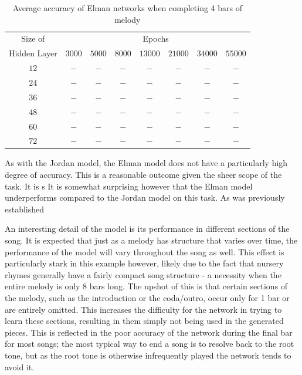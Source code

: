 \documentclass[ author={Stephen Livermore-Tozer},
				supervisor={Dr. Peter Flach},
				degree={MEng},
				title={Algorithmic Co-composition Using Machine Learning},
				subtitle={},
				type={research},
				year={2016} ]{dissertation}
\begin{document}
	\begin{table}[htp]
		\begin{center}
			\begin{tabular}{cccccccc}
				\toprule
				Size of& \multicolumn{7}{c}{Epochs}\\
				\cline{2-8}
				Hidden Layer& $3000$ & $5000$ & $8000$ & $13000$ & $21000$ & $34000$ & $55000$\\
				\hline
				$12$ & $-$ & $-$ & $-$ & $-$ & $-$ & $-$ & $-$\\
				$24$ & $-$ & $-$ & $-$ & $-$ & $-$ & $-$ & $-$\\
				$36$ & $-$ & $-$ & $-$ & $-$ & $-$ & $-$ & $-$\\
				$48$ & $-$ & $-$ & $-$ & $-$ & $-$ & $-$ & $-$\\
				$60$ & $-$ & $-$ & $-$ & $-$ & $-$ & $-$ & $-$\\
				$72$ & $-$ & $-$ & $-$ & $-$ & $-$ & $-$ & $-$\\
				\bottomrule
			\end{tabular}
		\end{center}
		\caption{Average accuracy of Elman networks when completing 4 bars of melody}
		\label{tab:elman-4-bar-results}
	\end{table}
	
	As with the Jordan model, the Elman model does not have a particularly high degree of accuracy. This is a reasonable outcome given the sheer scope of the task.
	It is s
	It is somewhat surprising however that the Elman model underperforms compared to the Jordan model on this task. As was previously established 
	
	An interesting detail of the model is its performance in different sections of the song. It is expected that just as a melody has structure that varies over time, the performance of the model will vary throughout the song as well. This effect is particularly stark in this example however, likely due to the fact that nursery rhymes generally have a fairly compact song structure - a necessity when the entire melody is only 8 bars long. The upshot of this is that certain sections of the melody, such as the introduction or the coda/outro, occur only for 1 bar or are entirely omitted. This increases the difficulty for the network in trying to learn these sections, resulting in them simply not being used in the generated pieces. This is reflected in the poor accuracy of the network during the final bar for most songs; the most typical way to end a song is to resolve back to the root tone, but as the root tone is otherwise infrequently played the network tends to avoid it. 
	
\end{document}
